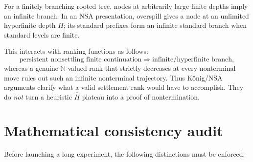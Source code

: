 \documentclass[11pt]{article}
\newcommand{\N}{\mathbb{N}}
\newcommand{\Hhat}{\widehat H}
\begin{document}
For a finitely branching rooted tree, nodes at arbitrarily large finite depths imply an infinite branch. In an NSA presentation, overspill gives a node at an unlimited hyperfinite depth $H$; its standard prefixes form an infinite standard branch when standard levels are finite.

This interacts with ranking functions as follows:
\[
\text{persistent nonsettling finite continuation}
\Rightarrow
\text{infinite/hyperfinite branch},
\]
whereas a genuine $\N$-valued rank that strictly decreases at every nonterminal move rules out such an infinite nonterminal trajectory. Thus K\"onig/NSA arguments clarify what a valid settlement rank would have to accomplish. They do \emph{not} turn a heuristic $\Hhat$ plateau into a proof of nontermination.

\section{Mathematical consistency audit}

Before launching a long experiment, the following distinctions must be enforced.
\end{document}
